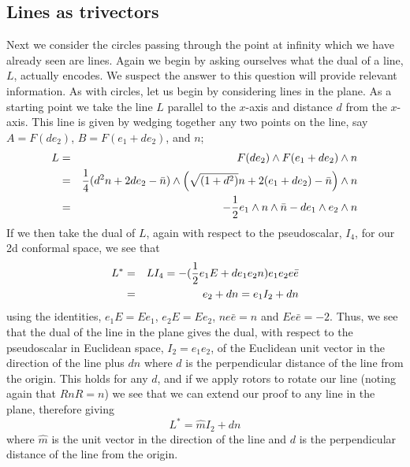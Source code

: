 \subsection{Lines as trivectors}

 Next we consider the circles passing through
the point at infinity which we have already seen are
lines. Again we begin by asking ourselves what the dual
of a line, $L$, actually encodes. We suspect the answer to
this question will provide relevant information.  
As with circles, let us begin by considering lines in the plane.
As a starting point we take the line $L$ parallel to the $x$-axis and
distance $d$ from the $x$-axis.
%
%
This line is given by wedging together any two points on
the line, say $A = F(de_2)$, $B = F(e_1 + de_2)$, and $n$;
%
\begin{eqnarray}
L & = & F(de_2)\wedge F(e_1 + de_2)\wedge n \nonumber \\
  & = & \frac{1}{4}(d^2n+2de_2-\bar{n})\wedge
  \left(\sqrt{(1+d^2)}n+2(e_1+de_2)-\bar{n}\right)\wedge n \nonumber \\
  & = & -\frac{1}{2} e_1\wedge n\wedge \bar{n} - d e_1\wedge e_2\wedge
  n
\end{eqnarray}
%
If we then take the dual of $L$, again with respect to
the pseudoscalar, $I_4$, for our 2d conformal space, we
see that
%
\begin{eqnarray}
L^* & = & LI_4 = -(\frac{1}{2} e_1E + de_1 e_2n)e_1e_2e\bar{e} \nonumber \\
    & = & e_2 + dn = e_1I_2 + dn
\end{eqnarray}
%
using the identities, $e_1E=Ee_1$, $e_2E=Ee_2$,
$ne\bar{e}=n$ and $Ee\bar{e}=-2$. Thus, we see that the
dual of the line in the plane gives the dual, with
respect to the pseudoscalar in Euclidean space,
$I_2=e_1e_2$, of the Euclidean unit vector in the
direction of the line plus $dn$ where $d$ is the
perpendicular distance of the line from the origin. This
holds for any $d$, and if we apply rotors to rotate our
line (noting again that $RnR=n$) we see that we can
extend our proof to any line in the plane, therefore
giving
%
\begin{equation}
L^* = \hat{m}I_2 + dn
\end{equation}
%
where $\hat{m}$ is the unit vector in the direction of
the line and $d$ is the perpendicular distance of the
line from the origin.

